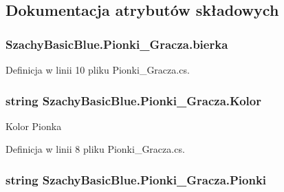 \subsection{Dokumentacja atrybutów składowych}
\hypertarget{class_szachy_basic_blue_1_1_pionki___gracza_ae84a422688851904d03ae1753bd11771}{
\subsubsection[{bierka}]{ Szachy\-Basic\-Blue.\-Pionki\-\_\-\-Gracza.\-bierka\hspace{0.3cm}{\ttfamily [private]}}}\label{class_szachy_basic_blue_1_1_pionki___gracza_ae84a422688851904d03ae1753bd11771}


Definicja w linii 10 pliku Pionki\-\_\-\-Gracza.\-cs.

\hypertarget{class_szachy_basic_blue_1_1_pionki___gracza_af6f6c6b9f0068cedae2da45843fa4a11}{
\subsubsection[{Kolor}]{\setlength{\rightskip}{0pt plus 5cm}string Szachy\-Basic\-Blue.\-Pionki\-\_\-\-Gracza.\-Kolor}}\label{class_szachy_basic_blue_1_1_pionki___gracza_af6f6c6b9f0068cedae2da45843fa4a11}


Kolor Pionka 



Definicja w linii 8 pliku Pionki\-\_\-\-Gracza.\-cs.

\hypertarget{class_szachy_basic_blue_1_1_pionki___gracza_af92a1285e98224184d83bcc77ba69e9f}{
\subsubsection[{Pionki}]{\setlength{\rightskip}{0pt plus 5cm}string Szachy\-Basic\-Blue.\-Pionki\-\_\-\-Gracza.\-Pionki}}\label{class_szachy_basic_blue_1_1_pionki___gracza_af92a1285e98224184d83bcc77ba69e9f}


